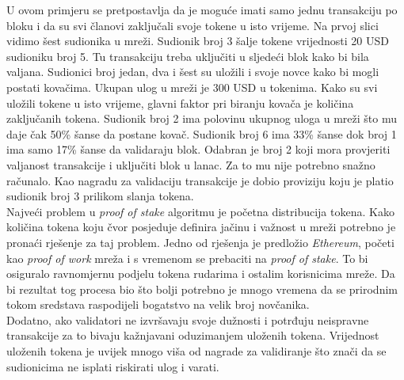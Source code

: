 \documentclass[times, utf8, zavrsni, numeric]{fer}
\begin{document}
\pagebreak
U ovom primjeru se pretpostavlja da je moguće imati samo jednu transakciju po bloku i da su svi članovi zaključali svoje tokene u isto vrijeme.
Na prvoj slici vidimo šest sudionika u mreži. Sudionik broj 3 šalje tokene vrijednosti 20 USD sudioniku broj 5. Tu transakciju treba uključiti u sljedeći blok kako bi bila valjana.
Sudionici broj jedan, dva i šest su uložili i svoje novce kako bi mogli postati kovačima. Ukupan ulog u mreži je 300 USD u tokenima. Kako su svi uložili tokene u isto vrijeme,
glavni faktor pri biranju kovača je količina zaključanih tokena. Sudionik broj 2 ima polovinu ukupnog uloga u mreži što mu daje čak 50\% šanse da postane kovač.
Sudionik broj 6 ima 33\% šanse dok broj 1 ima samo 17\% šanse da validaraju blok. Odabran je broj 2 koji mora provjeriti valjanost transakcije i uključiti blok u lanac.
Za to mu nije potrebno snažno računalo. Kao nagradu za validaciju transakcije je dobio proviziju koju je platio sudionik broj 3 prilikom slanja tokena. \\
Najveći problem u \emph{proof of stake} algoritmu je početna distribucija tokena. Kako količina tokena koju čvor posjeduje definira jačinu i važnost u mreži potrebno
je pronaći rješenje za taj problem. Jedno od rješenja je predložio \emph{Ethereum}, početi kao \emph{proof of work} mreža i s vremenom se prebaciti na \emph{proof of stake}.
To bi osiguralo ravnomjernu podjelu tokena rudarima i ostalim korisnicima mreže. Da bi rezultat tog procesa bio što bolji potrebno je mnogo vremena da se prirodnim 
tokom sredstava raspodijeli bogatstvo na velik broj novčanika. \\
Dodatno, ako validatori ne izvršavaju svoje dužnosti i potrđuju neispravne transakcije za to bivaju kažnjavani oduzimanjem uloženih tokena. Vrijednost uloženih tokena je
uvijek mnogo viša od nagrade za validiranje što znači da se sudionicima ne isplati riskirati ulog i varati.
\end{document}
